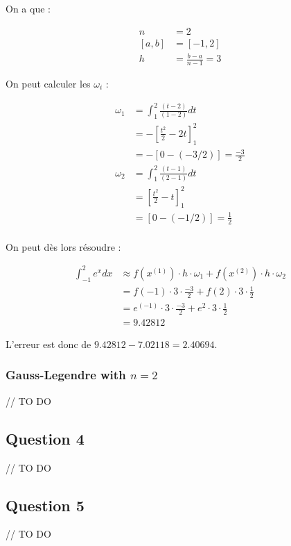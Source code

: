 On a que :

\begin{equation}
	\begin{aligned}
		n &= 2\\
		[a, b] &= [-1, 2]\\
		h &= \frac{b-a}{n-1} = 3
	\end{aligned}
\end{equation}

On peut calculer les $\omega_i$ :

\begin{equation}
	\begin{aligned}
		\omega_1 &= \int_1^2 \frac{(t-2)}{(1-2)} dt\\
		&= -\left [\frac{t^2}{2}-2t \right ]_1^2\\
		&= -\left [0 - (-3/2)\right] = \frac{-3}{2}\\
		\omega_2 &= \int_1^2 \frac{(t-1)}{(2-1)} dt\\
		&= \left [\frac{t^2}{2}-t \right ]_1^2\\
		&= \left [0 - (-1/2)\right] = \frac{1}{2}\\
	\end{aligned}
\end{equation}

On peut dès lors résoudre :

\begin{equation}
	\begin{aligned}
		\int_{-1}^2 e^x dx &\approx f(x^{(1)}) \cdot h \cdot \omega_1 + f(x^{(2)}) \cdot h \cdot \omega_2\\
		&= f(-1) \cdot 3 \cdot \frac{-3}{2} + f(2) \cdot 3 \cdot \frac{1}{2}\\
		&= e^{(-1)} \cdot 3 \cdot \frac{-3}{2} + e^2 \cdot 3 \cdot \frac{1}{2}\\
		&= 9.42812
	\end{aligned}
\end{equation}

L'erreur est donc de $9.42812 - 7.02118 = 2.40694$.

\subsubsection{Gauss-Legendre with $n = 2$}

// TO DO

\subsection{Question 4}

// TO DO


\subsection{Question 5}

// TO DO